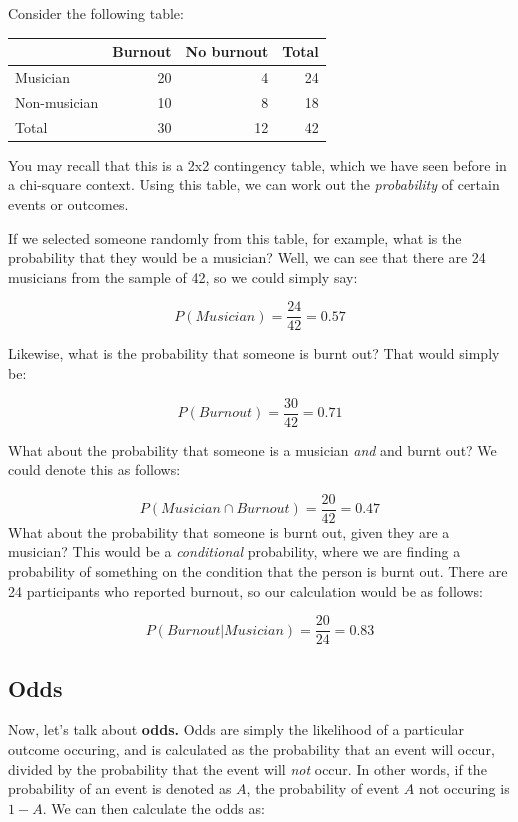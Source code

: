 \documentclass[
]{book}
\begin{document}
Consider the following table:

\begin{tabular}{l|r|r|r}
\hline
 & Burnout & No burnout & Total\\
\hline
Musician & 20 & 4 & 24\\
\hline
Non-musician & 10 & 8 & 18\\
\hline
Total & 30 & 12 & 42\\
\hline
\end{tabular}

You may recall that this is a 2x2 contingency table, which we have seen before in a chi-square context. Using this table, we can work out the \emph{probability} of certain events or outcomes.

If we selected someone randomly from this table, for example, what is the probability that they would be a musician? Well, we can see that there are 24 musicians from the sample of 42, so we could simply say:

\[
P(Musician) = \frac{24}{42} = 0.57
\]

Likewise, what is the probability that someone is burnt out? That would simply be:

\[
P(Burnout) = \frac{30}{42} = 0.71
\]

What about the probability that someone is a musician \emph{and} and burnt out? We could denote this as follows:

\[
P(Musician \cap Burnout) = \frac{20}{42} = 0.47
\]
What about the probability that someone is burnt out, given they are a musician? This would be a \emph{conditional} probability, where we are finding a probability of something on the condition that the person is burnt out. There are 24 participants who reported burnout, so our calculation would be as follows:

\[
P(Burnout | Musician) = \frac{20}{24} = 0.83
\]

\subsection{Odds}\label{odds}

Now, let's talk about \textbf{odds.} Odds are simply the likelihood of a particular outcome occuring, and is calculated as the probability that an event will occur, divided by the probability that the event will \emph{not} occur. In other words, if the probability of an event is denoted as \(A\), the probability of event \(A\) not occuring is \(1-A\). We can then calculate the odds as:
\end{document}
